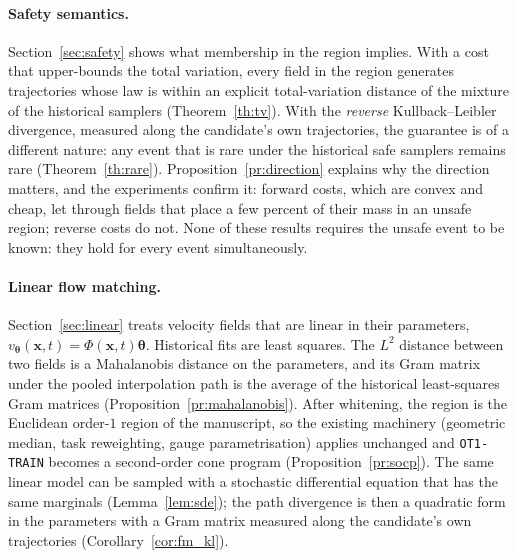 \documentclass{article}
\newcommand{\bth}{\boldsymbol{\theta}}
\newcommand{\bx}{\mathbf{x}}
\theoremstyle{plain}
\begin{document}
\paragraph{Safety semantics.}
Section~\ref{sec:safety} shows what membership in the region implies. With a cost that
upper-bounds the total variation, every field in the region generates trajectories whose
law is within an explicit total-variation distance of the mixture of the historical
samplers (Theorem~\ref{th:tv}). With the \emph{reverse} Kullback--Leibler divergence, measured
along the candidate's own trajectories, the guarantee is of a different nature: any event
that is rare under the historical safe samplers remains rare
(Theorem~\ref{th:rare}). Proposition~\ref{pr:direction} explains why the direction
matters, and the experiments confirm it: forward costs, which are convex and cheap, let
through fields that place a few percent of their mass in an unsafe region; reverse costs do
not. None of these results requires the unsafe event to be known: they hold for every
event simultaneously.

\paragraph{Linear flow matching.}
Section~\ref{sec:linear} treats velocity fields that are linear in their parameters,
$v_{\bth}(\bx,t)=\Phi(\bx,t)\bth$. Historical fits are least squares. The $L^2$ distance between
two fields is a Mahalanobis distance on the parameters, and its Gram matrix under the
pooled interpolation path is the average of the historical least-squares Gram matrices
(Proposition~\ref{pr:mahalanobis}). After whitening, the region is the Euclidean order-$1$
region of the manuscript, so the existing machinery (geometric median, task reweighting,
gauge parametrisation) applies unchanged and \texttt{OT1-TRAIN} becomes a second-order cone
program (Proposition~\ref{pr:socp}). The same linear model can be sampled with a stochastic
differential equation that has the same marginals (Lemma~\ref{lem:sde}); the path divergence is
then a quadratic form in the parameters with a Gram matrix measured along the candidate's
own trajectories (Corollary~\ref{cor:fm_kl}).
\end{document}
